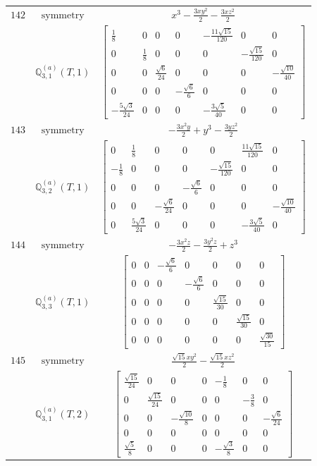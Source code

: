 \documentclass[fleqn,8pt,landscape]{jsarticle}
\begin{document}
\begin{longtable}{ccc}
$ 142 $ & $ \text{symmetry} $ & $ x^{3} - \frac{3 x y^{2}}{2} - \frac{3 x z^{2}}{2} $ \\
$  $ & $ \mathbb{Q}_{3,1}^{(a)}(T,1) $ & $ \begin{bmatrix} \frac{1}{8} & 0 & 0 & 0 & - \frac{11 \sqrt{15}}{120} & 0 & 0 \\ 0 & \frac{1}{8} & 0 & 0 & 0 & - \frac{\sqrt{15}}{120} & 0 \\ 0 & 0 & \frac{\sqrt{6}}{24} & 0 & 0 & 0 & - \frac{\sqrt{10}}{40} \\ 0 & 0 & 0 & - \frac{\sqrt{6}}{6} & 0 & 0 & 0 \\ - \frac{5 \sqrt{3}}{24} & 0 & 0 & 0 & - \frac{3 \sqrt{5}}{40} & 0 & 0 \end{bmatrix} $ \\ \hline
$ 143 $ & $ \text{symmetry} $ & $ - \frac{3 x^{2} y}{2} + y^{3} - \frac{3 y z^{2}}{2} $ \\
$  $ & $ \mathbb{Q}_{3,2}^{(a)}(T,1) $ & $ \begin{bmatrix} 0 & \frac{1}{8} & 0 & 0 & 0 & \frac{11 \sqrt{15}}{120} & 0 \\ - \frac{1}{8} & 0 & 0 & 0 & - \frac{\sqrt{15}}{120} & 0 & 0 \\ 0 & 0 & 0 & - \frac{\sqrt{6}}{6} & 0 & 0 & 0 \\ 0 & 0 & - \frac{\sqrt{6}}{24} & 0 & 0 & 0 & - \frac{\sqrt{10}}{40} \\ 0 & \frac{5 \sqrt{3}}{24} & 0 & 0 & 0 & - \frac{3 \sqrt{5}}{40} & 0 \end{bmatrix} $ \\ \hline
$ 144 $ & $ \text{symmetry} $ & $ - \frac{3 x^{2} z}{2} - \frac{3 y^{2} z}{2} + z^{3} $ \\
$  $ & $ \mathbb{Q}_{3,3}^{(a)}(T,1) $ & $ \begin{bmatrix} 0 & 0 & - \frac{\sqrt{6}}{6} & 0 & 0 & 0 & 0 \\ 0 & 0 & 0 & - \frac{\sqrt{6}}{6} & 0 & 0 & 0 \\ 0 & 0 & 0 & 0 & \frac{\sqrt{15}}{30} & 0 & 0 \\ 0 & 0 & 0 & 0 & 0 & \frac{\sqrt{15}}{30} & 0 \\ 0 & 0 & 0 & 0 & 0 & 0 & \frac{\sqrt{30}}{15} \end{bmatrix} $ \\ \hline
$ 145 $ & $ \text{symmetry} $ & $ \frac{\sqrt{15} x y^{2}}{2} - \frac{\sqrt{15} x z^{2}}{2} $ \\
$  $ & $ \mathbb{Q}_{3,1}^{(a)}(T,2) $ & $ \begin{bmatrix} \frac{\sqrt{15}}{24} & 0 & 0 & 0 & - \frac{1}{8} & 0 & 0 \\ 0 & \frac{\sqrt{15}}{24} & 0 & 0 & 0 & - \frac{3}{8} & 0 \\ 0 & 0 & - \frac{\sqrt{10}}{8} & 0 & 0 & 0 & - \frac{\sqrt{6}}{24} \\ 0 & 0 & 0 & 0 & 0 & 0 & 0 \\ \frac{\sqrt{5}}{8} & 0 & 0 & 0 & - \frac{\sqrt{3}}{8} & 0 & 0 \end{bmatrix} $ \\ \hline

\end{longtable}
\end{document}
